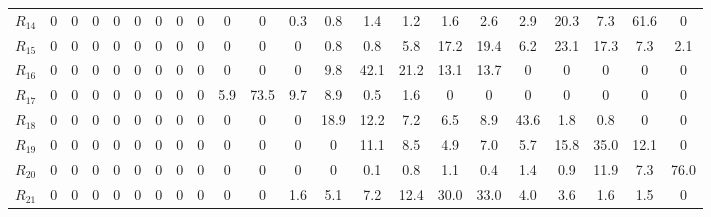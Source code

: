 \begin{table}[h!]
\begin{tabularx}{\textwidth}{X|CCCCCCCCCCCCCCCCCCCCC}
$R_{14}$ & 0 & 0 & 0 & 0 & 0 & 0 & 0 & 0 & 0 & 0 & 0.3 & 0.8 & 1.4 & 1.2 & 1.6 & 2.6 & 2.9 & 20.3 & 7.3 & 61.6 & 0 \\
$R_{15}$ & 0 & 0 & 0 & 0 & 0 & 0 & 0 & 0 & 0 & 0 & 0 & 0.8 & 0.8 & 5.8 & 17.2 & 19.4 & 6.2 & 23.1 & 17.3 & 7.3 & 2.1 \\
$R_{16}$ & 0 & 0 & 0 & 0 & 0 & 0 & 0 & 0 & 0 & 0 & 0 & 9.8 & 42.1 & 21.2 & 13.1 & 13.7 & 0 & 0 & 0 & 0 & 0 \\
$R_{17}$ & 0 & 0 & 0 & 0 & 0 & 0 & 0 & 0 & 5.9 & 73.5 & 9.7 & 8.9 & 0.5 & 1.6 & 0 & 0 & 0 & 0 & 0 & 0 & 0 \\
$R_{18}$ & 0 & 0 & 0 & 0 & 0 & 0 & 0 & 0 & 0 & 0 & 0 & 18.9 & 12.2 & 7.2 & 6.5 & 8.9 & 43.6 & 1.8 & 0.8 & 0 & 0 \\
$R_{19}$ & 0 & 0 & 0 & 0 & 0 & 0 & 0 & 0 & 0 & 0 & 0 & 0 & 11.1 & 8.5 & 4.9 & 7.0 & 5.7 & 15.8 & 35.0 & 12.1 & 0 \\
$R_{20}$ & 0 & 0 & 0 & 0 & 0 & 0 & 0 & 0 & 0 & 0 & 0 & 0 & 0.1 & 0.8 & 1.1 & 0.4 & 1.4 & 0.9 & 11.9 & 7.3 & 76.0 \\
$R_{21}$ & 0 & 0 & 0 & 0 & 0 & 0 & 0 & 0 & 0 & 0 & 1.6 & 5.1 & 7.2 & 12.4 & 30.0 & 33.0 & 4.0 & 3.6 & 1.6 & 1.5 & 0 \\
\bottomrule
\end{tabularx}
\end{table}
